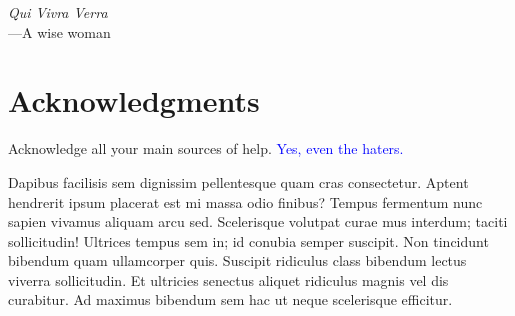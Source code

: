 
\begin{flushright}{\slshape
    Qui Vivra Verra} \\ \medskip
    ---A wise woman
\end{flushright}



\bigskip

\begingroup
\let\clearpage\relax
\let\cleardoublepage\relax
\let\cleardoublepage\relax
\chapter*{Acknowledgments}
Acknowledge all your main sources of help. \textcolor{blue}{Yes, even the haters.}

Dapibus facilisis sem dignissim pellentesque quam cras consectetur. Aptent hendrerit ipsum placerat est mi massa odio finibus? Tempus fermentum nunc sapien vivamus aliquam arcu sed. Scelerisque volutpat curae mus interdum; taciti sollicitudin! Ultrices tempus sem in; id conubia semper suscipit. Non tincidunt bibendum quam ullamcorper quis. Suscipit ridiculus class bibendum lectus viverra sollicitudin. Et ultricies senectus aliquet ridiculus magnis vel dis curabitur. Ad maximus bibendum sem hac ut neque scelerisque efficitur.

\bigskip


\endgroup
